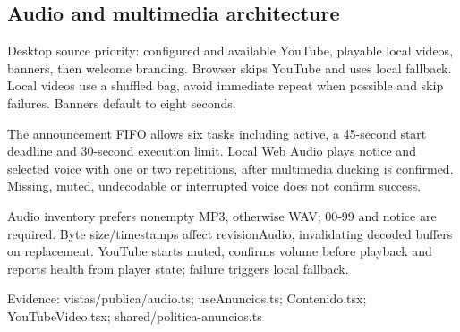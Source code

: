 \subsection{Audio and multimedia architecture}

Desktop source priority: configured and available YouTube, playable local videos, banners, then welcome branding. Browser skips YouTube and uses local fallback. Local videos use a shuffled bag, avoid immediate repeat when possible and skip failures. Banners default to eight seconds.

The announcement FIFO allows six tasks including active, a 45-second start deadline and 30-second execution limit. Local Web Audio plays notice and selected voice with one or two repetitions, after multimedia ducking is confirmed. Missing, muted, undecodable or interrupted voice does not confirm success.

Audio inventory prefers nonempty MP3, otherwise WAV; 00-99 and notice are required. Byte size/timestamps affect revisionAudio, invalidating decoded buffers on replacement. YouTube starts muted, confirms volume before playback and reports health from player state; failure triggers local fallback.

Evidence: vistas/publica/audio.ts; useAnuncios.ts; Contenido.tsx; YouTubeVideo.tsx; shared/politica-anuncios.ts
